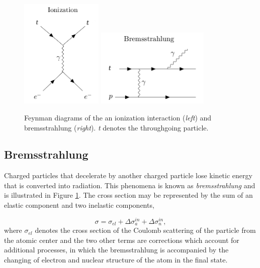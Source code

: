 \begin{figure}
\centering
\includegraphics[width = 0.35\textwidth]{chapter4/img/Feynman_Ionization_2.png}
\includegraphics[width = 0.48\textwidth]{chapter4/img/Feynman_Bremsstrahlung_2.png}
\caption{Feynman diagrams of the an ionization interaction (\textit{left}) and bremsstrahlung (\textit{right}). \textit{t} denotes the throughgoing particle.}
\label{fig:feynmanionizbrems}
\end{figure}


\subsection{Bremsstrahlung}
Charged particles that decelerate by another charged particle lose kinetic energy that is converted into radiation. This phenomena is known as \textit{bremsstrahlung} and is illustrated in Figure \ref{fig:feynmanionizbrems}. The cross section may be represented by the sum of an elastic component and two inelastic components,

\begin{equation}
\sigma = \sigma_{el} + \Delta \sigma^{in}_a + \Delta \sigma^{in}_n,
\end{equation}
where $\sigma_{el}$ denotes the cross section of the Coulomb scattering of the particle from the atomic center and the two other terms are corrections which account for additional processes, in which the bremsstrahlung is accompanied by the changing of electron and nuclear structure of the atom in the final state.

